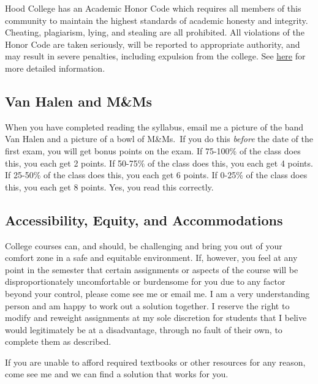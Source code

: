 \documentclass{article}
\begin{document}
Hood College has an Academic Honor Code which requires all members of
this community to maintain the highest standards of academic honesty and
integrity. Cheating, plagiarism, lying, and stealing are all prohibited.
All violations of the Honor Code are taken seriously, will be reported
to appropriate authority, and may result in severe penalties, including
expulsion from the college. See
\href{http://hood.smartcatalogiq.com/en/2016-2017/Catalog/The-Spirit-of-Hood/The-Academic-Honor-Code-and-Code-of-Conduct}{here}
for more detailed information.

\hypertarget{van-halen-and-mms}{%
\subsection{Van Halen and M\&Ms}\label{van-halen-and-mms}}

When you have completed reading the syllabus, email me a picture of the
band Van Halen and a picture of a bowl of M\&Ms.~If you do this
\emph{before} the date of the first exam, you will get bonus points on
the exam. If 75-100\% of the class does this, you each get 2 points. If
50-75\% of the class does this, you each get 4 points. If 25-50\% of the
class does this, you each get 6 points. If 0-25\% of the class does
this, you each get 8 points. Yes, you read this correctly.

\hypertarget{accessibility-equity-and-accommodations}{%
\subsection{Accessibility, Equity, and
Accommodations}\label{accessibility-equity-and-accommodations}}

College courses can, and should, be challenging and bring you out of
your comfort zone in a safe and equitable environment. If, however, you
feel at any point in the semester that certain assignments or aspects of
the course will be disproportionately uncomfortable or burdensome for
you due to any factor beyond your control, please come see me or email
me. I am a very understanding person and am happy to work out a solution
together. I reserve the right to modify and reweight assignments at my
sole discretion for students that I belive would legitimately be at a
disadvantage, through no fault of their own, to complete them as
described.

If you are unable to afford required textbooks or other resources for
any reason, come see me and we can find a solution that works for you.
\end{document}
